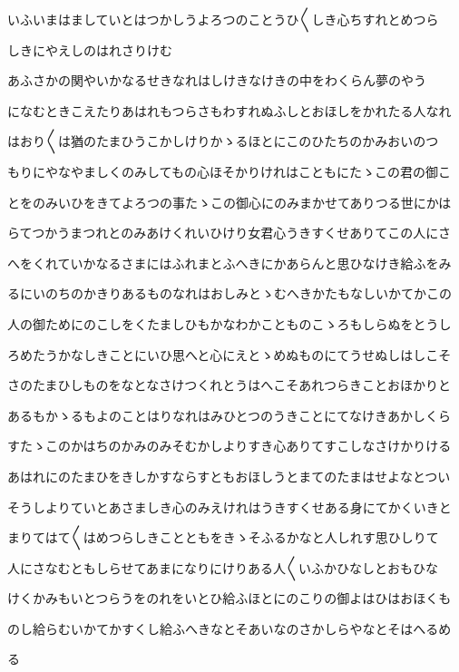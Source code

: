 \documentclass[a4paper,11pt,landscape]{ltjtarticle}
\begin{document}
\par\medskip
いふいまはましていとはつかしうよろつのことうひ〱しき心ちすれとめつら
\par\medskip
しきにやえしのはれさりけむ
\par\medskip
あふさかの関やいかなるせきなれはしけきなけきの中をわくらん夢のやう
\par\medskip
になむときこえたりあはれもつらさもわすれぬふしとおほしをかれたる人なれ
\par\medskip
はおり〱は猶のたまひうこかしけりかゝるほとにこのひたちのかみおいのつ
\par\medskip
もりにやなやましくのみしてもの心ほそかりけれはこともにたゝこの君の御こ
\par\medskip
とをのみいひをきてよろつの事たゝこの御心にのみまかせてありつる世にかは
\par\medskip
らてつかうまつれとのみあけくれいひけり女君心うきすくせありてこの人にさ
\par\medskip
へをくれていかなるさまにはふれまとふへきにかあらんと思ひなけき給ふをみ
\par\medskip
るにいのちのかきりあるものなれはおしみとゝむへきかたもなしいかてかこの
\par\medskip
人の御ためにのこしをくたましひもかなわかことものこゝろもしらぬをとうし
\par\medskip
ろめたうかなしきことにいひ思へと心にえとゝめぬものにてうせぬしはしこそ
\par\medskip
さのたまひしものをなとなさけつくれとうはへこそあれつらきことおほかりと
\par\medskip
あるもかゝるもよのことはりなれはみひとつのうきことにてなけきあかしくら
\par\medskip
すたゝこのかはちのかみのみそむかしよりすき心ありてすこしなさけかりける
\par\medskip
あはれにのたまひをきしかすならすともおほしうとまてのたまはせよなとつい
\par\medskip
そうしよりていとあさましき心のみえけれはうきすくせある身にてかくいきと
\par\medskip
まりてはて〱はめつらしきことともをきゝそふるかなと人しれす思ひしりて
\par\medskip
人にさなむともしらせてあまになりにけりある人〱いふかひなしとおもひな
\par\medskip
けくかみもいとつらうをのれをいとひ給ふほとにのこりの御よはひはおほくも
\par\medskip
のし給らむいかてかすくし給ふへきなとそあいなのさかしらやなとそはへるめ
\par\medskip
る
\par\medskip
\end{document}
